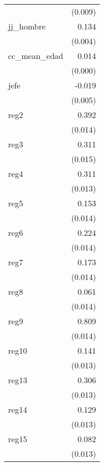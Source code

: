 {\begin{longtable}{l*{1}{D{.}{.}{-1}}}
            &     (0.009)         \\
\addlinespace
jj\_hombre   &       0.134\sym{***}\\
            &     (0.004)         \\
\addlinespace
cc\_mean\_edad&       0.014\sym{***}\\
            &     (0.000)         \\
\addlinespace
jefe        &      -0.019\sym{***}\\
            &     (0.005)         \\
\addlinespace
reg2        &       0.392\sym{***}\\
            &     (0.014)         \\
\addlinespace
reg3        &       0.311\sym{***}\\
            &     (0.015)         \\
\addlinespace
reg4        &       0.311\sym{***}\\
            &     (0.013)         \\
\addlinespace
reg5        &       0.153\sym{***}\\
            &     (0.014)         \\
\addlinespace
reg6        &       0.224\sym{***}\\
            &     (0.014)         \\
\addlinespace
reg7        &       0.173\sym{***}\\
            &     (0.014)         \\
\addlinespace
reg8        &       0.061\sym{***}\\
            &     (0.014)         \\
\addlinespace
reg9        &       0.809\sym{***}\\
            &     (0.014)         \\
\addlinespace
reg10       &       0.141\sym{***}\\
            &     (0.013)         \\
\addlinespace
reg13       &       0.306\sym{***}\\
            &     (0.013)         \\
\addlinespace
reg14       &       0.129\sym{***}\\
            &     (0.013)         \\
\addlinespace
reg15       &       0.082\sym{***}\\
            &     (0.013)         \\

\end{longtable}}
